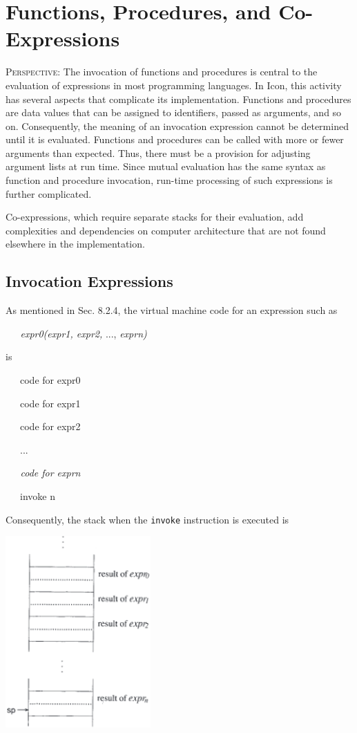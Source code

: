 \chapter{Functions, Procedures, and Co-Expressions}

\textsc{Perspective}: The invocation of functions and procedures is
central to the evaluation of expressions in most programming
languages. In Icon, this activity has several aspects that complicate
its implementation. Functions and procedures are data values that can
be assigned to identifiers, passed as arguments, and so
on. Consequently, the meaning of an invocation expression cannot be
determined until it is evaluated. Functions and procedures can be
called with more or fewer arguments than expected. Thus, there must be
a provision for adjusting argument lists at run time.  Since mutual
evaluation has the same syntax as function and procedure invocation,
run-time processing of such expressions is further complicated.

Co-expressions, which require separate stacks for their evaluation,
add complexities and dependencies on computer architecture that are
not found elsewhere in the implementation.

\section{Invocation Expressions}

As mentioned in Sec. 8.2.4, the virtual machine code for an expression such as

{\ttfamily\mdseries
\textit{\ \ \ expr0(expr1, expr2, }..., \textit{exprn)}}

\noindent is

{\ttfamily\mdseries
\ \ \ code for expr0}

{\ttfamily\mdseries
\ \ \ code for expr1}

{\ttfamily\mdseries
\ \ \ code for expr2}

{\ttfamily\mdseries
\ \ \ ...}

{\ttfamily\itshape
\ \ \ code for exprn}

{\ttfamily
\ \ \ invoke n}


Consequently, the stack when the \texttt{invoke} instruction is executed is

\begin{center}
\includegraphics[width=2.19in,height=2.88in]{ib-img/invokestack.png}
\end{center}

